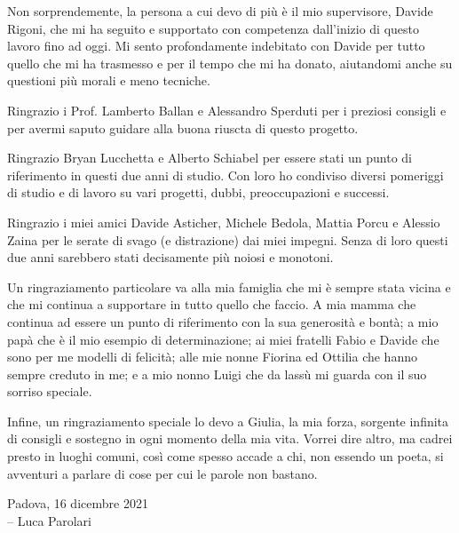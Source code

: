 
Non sorprendemente, la persona a cui devo di più è il mio supervisore,
Davide Rigoni, che mi ha seguito e supportato con competenza
dall'inizio di questo lavoro fino ad oggi. Mi sento profondamente
indebitato con Davide per tutto quello che mi ha trasmesso e per il
tempo che mi ha donato, aiutandomi anche su questioni più morali e
meno tecniche.

\vspace{0.2cm}

Ringrazio i Prof. Lamberto Ballan e Alessandro Sperduti per i preziosi
consigli e per avermi saputo guidare alla buona riuscta di questo
progetto.

\vspace{0.2cm}

Ringrazio Bryan Lucchetta e Alberto Schiabel per essere stati un punto
di riferimento in questi due anni di studio. Con loro ho condiviso
diversi pomeriggi di studio e di lavoro su vari progetti, dubbi,
preoccupazioni e successi.

\vspace{0.2cm}

Ringrazio i miei amici Davide Asticher, Michele Bedola, Mattia Porcu e
Alessio Zaina per le serate di svago (e distrazione) dai miei impegni.
Senza di loro questi due anni sarebbero stati decisamente più noiosi e
monotoni.

\vspace{0.2cm}

Un ringraziamento particolare va alla mia famiglia che mi è sempre
stata vicina e che mi continua a supportare in tutto quello che
faccio. A mia mamma che continua ad essere un punto di riferimento con
la sua generosità e bontà; a mio papà che è il mio esempio di
determinazione; ai miei fratelli Fabio e Davide che sono per me
modelli di felicità; alle mie nonne Fiorina ed Ottilia che hanno
sempre creduto in me; e a mio nonno Luigi che da lassù mi guarda con
il suo sorriso speciale.

\vspace{0.2cm}

Infine, un ringraziamento speciale lo devo a Giulia, la mia forza,
sorgente infinita di consigli e sostegno in ogni momento della mia
vita. Vorrei dire altro, ma cadrei presto in luoghi comuni, così come
spesso accade a chi, non essendo un poeta, si avventuri a parlare di
cose per cui le parole non bastano.

\vspace{1cm}

\begin{flushright}
  Padova, 16 dicembre 2021 \\
  -- Luca Parolari
\end{flushright}
